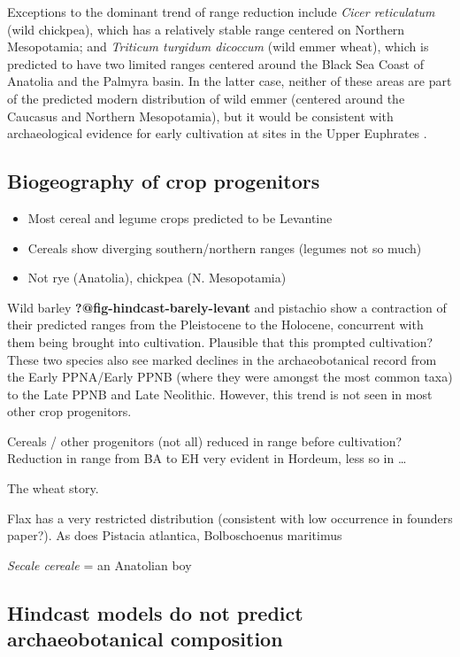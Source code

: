 \documentclass[
  authoryear,
  preprint]{elsarticle}
\providecommand{\tightlist}{%
  \setlength{\itemsep}{0pt}\setlength{\parskip}{0pt}}\usepackage{longtable,booktabs,array}
\begin{document}
Exceptions to the dominant trend of range reduction include \emph{Cicer
reticulatum} (wild chickpea), which has a relatively stable range
centered on Northern Mesopotamia; and \emph{Triticum turgidum dicoccum}
(wild emmer wheat), which is predicted to have two limited ranges
centered around the Black Sea Coast of Anatolia and the Palmyra basin.
In the latter case, neither of these areas are part of the predicted
modern distribution of wild emmer (centered around the Caucasus and
Northern Mesopotamia), but it would be consistent with archaeological
evidence for early cultivation at sites in the Upper Euphrates
\citep{Willcox2024}.

\subsection{Biogeography of crop
progenitors}\label{biogeography-of-crop-progenitors}

\begin{itemize}
\tightlist
\item
  Most cereal and legume crops predicted to be Levantine
\item
  Cereals show diverging southern/northern ranges (legumes not so much)
\item
  Not rye (Anatolia), chickpea (N. Mesopotamia)
\end{itemize}

Wild barley \textbf{?@fig-hindcast-barely-levant} and pistachio
\citep[\emph{Pistacia atlantica},][]{fig} show a contraction of their
predicted ranges from the Pleistocene to the Holocene, concurrent with
them being brought into cultivation. Plausible that this prompted
cultivation? These two species \citep{ArranzOtaeguiRoe2023} also see
marked declines in the archaeobotanical record from the Early PPNA/Early
PPNB (where they were amongst the most common taxa) to the Late PPNB and
Late Neolithic. However, this trend is not seen in most other crop
progenitors.

Cereals / other progenitors (not all) reduced in range before
cultivation? Reduction in range from BA to EH very evident in Hordeum,
less so in \ldots{}

The wheat story.

Flax has a very restricted distribution (consistent with low occurrence
in founders paper?). As does Pistacia atlantica, Bolboschoenus maritimus

\emph{Secale cereale} = an Anatolian boy

\subsection{Hindcast models do not predict archaeobotanical
composition}\label{hindcast-models-do-not-predict-archaeobotanical-composition}
\end{document}
